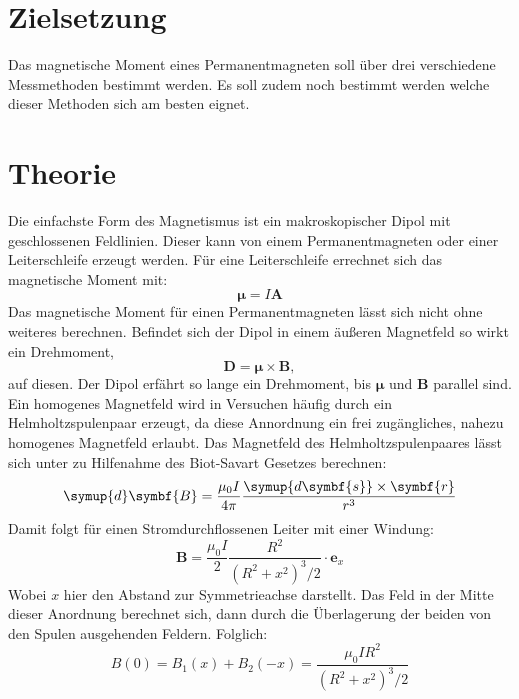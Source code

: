 \section{Zielsetzung}
Das magnetische Moment eines Permanentmagneten soll über drei verschiedene Messmethoden bestimmt werden.
Es soll zudem noch bestimmt werden welche dieser Methoden sich am besten eignet.
\section{Theorie}
\label{sec:Theorie}
Die einfachste Form des Magnetismus ist ein makroskopischer Dipol mit geschlossenen Feldlinien.
Dieser kann von einem Permanentmagneten oder einer Leiterschleife erzeugt werden.
Für eine Leiterschleife errechnet sich das magnetische Moment mit:
\begin{equation}
  \symbf{\mu} = I \symbf{A}
\end{equation}
Das magnetische Moment für einen Permanentmagneten lässt sich nicht ohne weiteres berechnen.
Befindet sich der Dipol in einem äußeren Magnetfeld so wirkt ein Drehmoment,
\begin{equation}
  \symbf{D} = \symbf{\mu}\times \symbf{B},
\end{equation}
auf diesen.
Der Dipol erfährt so lange ein Drehmoment, bis $\symbf{\mu}$ und $\symbf{B}$ parallel sind.
Ein homogenes Magnetfeld wird in Versuchen häufig durch ein Helmholtzspulenpaar erzeugt, da diese Annordnung ein frei 
zugängliches, nahezu homogenes Magnetfeld erlaubt.
Das Magnetfeld des Helmholtzspulenpaares lässt sich unter zu Hilfenahme des Biot-Savart Gesetzes berechnen:
\begin{equation}
\symup{d}\symbf{B}= \frac{\mu_0 I}{4 \pi} \frac{\symup{d\symbf{s}}\times \symbf{r}}{r^3}
\end{equation}
Damit folgt für einen Stromdurchflossenen Leiter mit einer Windung:
\begin{equation}
  \symbf{B}=\frac{\mu_0 I}{2} \frac{R^2}{(R^2 + x^2)^3/2 } \cdot \symbf{e}_x
\end{equation}
Wobei $x$ hier den Abstand zur Symmetrieachse darstellt.
Das Feld in der Mitte dieser Anordnung berechnet sich, dann durch die Überlagerung der beiden von den Spulen ausgehenden 
Feldern.
Folglich:
\begin{equation}
  B(0)= B_1(x)+B_2(-x) = \frac{\mu_0 I R^2}{(R^2+x^2)^3/2}
\end{equation}
%

